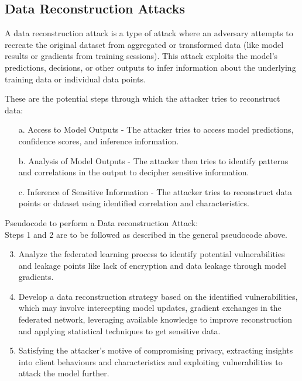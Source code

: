 \documentclass[conference]{IEEEtran}
\begin{document}
\subsection{Data Reconstruction Attacks}
A data reconstruction attack is a type of attack where an adversary attempts to recreate the original dataset from aggregated or transformed data (like model results or gradients from training sessions). This attack exploits the model's predictions, decisions, or other outputs to infer information about the underlying training data or individual data points.

These are the potential steps through which the attacker tries to reconstruct data:

\begin{itemize}
    \item[a.] Access to Model Outputs - The attacker tries to access model predictions, confidence scores, and inference information.
    \item[b.] Analysis of Model Outputs - The attacker then tries to identify patterns and correlations in the output to decipher sensitive information.
    \item[c.] Inference of Sensitive Information - The attacker tries to reconstruct data points or dataset using identified correlation and characteristics.
\end{itemize}

Pseudocode to perform a Data reconstruction Attack:\\
Steps 1 and 2 are to be followed as described in the general pseudocode above.
\begin{enumerate}
  \setcounter{enumi}{2}
\item  Analyze the federated learning process to identify potential vulnerabilities and leakage points like lack of encryption and data leakage through model gradients.

\item Develop a data reconstruction strategy based on the identified vulnerabilities, which may involve intercepting model updates, gradient exchanges in the federated network, leveraging available knowledge to improve reconstruction and applying statistical techniques to get sensitive data.
   
\item Satisfying the attacker's motive of compromising privacy, extracting insights into client behaviours and characteristics and exploiting vulnerabilities to attack the model further.

\end{enumerate} 
\end{document}
